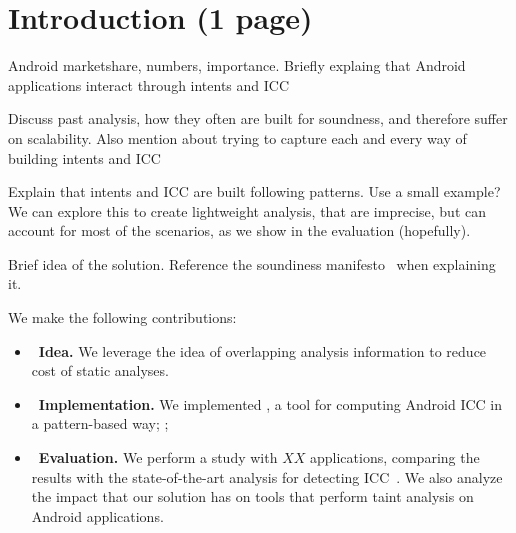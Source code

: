 \section{Introduction (1 page)}

Android marketshare, numbers, importance. 
Briefly explaing that Android applications interact through intents and ICC

Discuss past analysis, how they often are built for soundness, and therefore suffer on scalability. Also mention about trying to capture each and every way of building intents and ICC

Explain that intents and ICC are built following patterns. Use a small
example? We can explore this to create lightweight analysis, that are imprecise, but can account for most of the scenarios, as we show in the evaluation (hopefully). 

Brief idea of the solution. Reference the soundiness manifesto~\cite{soundiness-manifesto} when explaining it.

We make the following contributions:
\begin{itemize}
 \item~\textbf{Idea.} We leverage the idea of overlapping analysis information to
   reduce cost of static analyses.
 \item~\textbf{Implementation.} We implemented \tname, a tool for computing Android ICC in a
   pattern-based way; ;
 \item~\textbf{Evaluation.} We perform a study with $XX$ applications, comparing the results with the state-of-the-art analysis for detecting ICC~\cite{epicc,iccta,comdroid}. We also analyze the impact that our solution has on tools that perform taint analysis on Android applications. 
\end{itemize}


